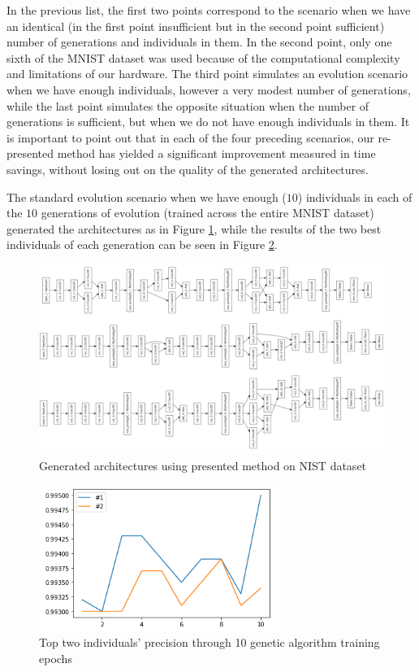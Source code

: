 \documentclass[eng]{simposium}
\begin{document}
In the previous list, the first two points correspond to the scenario when we have an identical  
(in the first point insufficient but in the second point sufficient) number of generations and individuals in them.  
In the second point, only one sixth of the MNIST dataset was used because of the computational complexity and limitations of our hardware.  
The third point simulates an evolution scenario when we have enough individuals, however a very modest number of generations,  
while the last point simulates the opposite situation when the number of generations is sufficient, but when we do not have  
enough individuals in them.  
It is important to point out that in each of the four preceding scenarios, our re-presented method has yielded a significant  
improvement measured in time savings, without losing out on the quality of the generated architectures.  
  

The standard evolution scenario when we have enough ($10$) individuals in each of the $10$ generations of evolution  
(trained across the entire MNIST dataset) generated the architectures as in Figure \ref{fig:architectures},  
while the results of the two best individuals of each generation can be seen in Figure \ref{fig:top2}.  

\begin{figure}[!ht] 
  \centering 
  \includegraphics[width=1\textwidth]{arhitekture.png} 
  \caption{Generated architectures using presented method on NIST dataset} 
  \label{fig:architectures} 
\end{figure} 

\begin{figure}[!ht] 
  \centering 
  \includegraphics[width=0.7\textwidth]{top1.png} 
  \caption{Top two individuals' precision through 10 genetic algorithm training epochs} 
  \label{fig:top2} 
\end{figure} 
\end{document}
